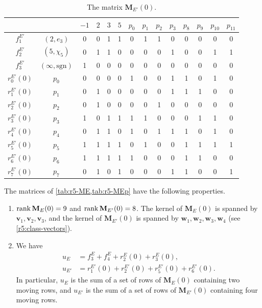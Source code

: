 \begin{table}[htbp]
\centering
\caption{The matrix $\mathbf M_{E'}(0)$.}\label{tab:r5-MEp}
\renewcommand{\arraystretch}{1.15}
\begin{tabular}{cc|cccc|cccccccc}
& & $-1$ & $2$ & $3$ & $5$ & $p_0$ & $p_1$ & $p_2$ & $p_3$ & $p_8$ & $p_9$ & $p_{10}$ & $p_{11}$\\
\hline
$f^{E'}_1$ & $(2,e_3)$ & 0 & 0 & 1 & 1 & 0 & 1 & 1 & 0 & 0 & 0 & 0 & 0 \\
$f^{E'}_2$ & $(5,\chi_5)$ & 0 & 1 & 1 & 0 & 0 & 0 & 0 & 1 & 0 & 0 & 1 & 1 \\
$f^{E'}_3$ & $(\infty,\mathrm{sgn})$ & 1 & 0 & 0 & 0 & 0 & 0 & 0 & 0 & 0 & 0 & 0 & 0 \\
\hline
$r^{E'}_0(0)$ & $p_0$ & 0 & 0 & 0 & 0 & 1 & 0 & 0 & 1 & 1 & 0 & 1 & 0 \\
$r^{E'}_1(0)$ & $p_1$ & 0 & 1 & 0 & 0 & 0 & 0 & 0 & 1 & 1 & 1 & 0 & 0 \\
$r^{E'}_2(0)$ & $p_2$ & 0 & 1 & 0 & 0 & 0 & 0 & 1 & 0 & 0 & 0 & 0 & 0 \\
$r^{E'}_3(0)$ & $p_3$ & 1 & 0 & 1 & 1 & 1 & 1 & 0 & 0 & 0 & 1 & 1 & 0 \\
$r^{E'}_4(0)$ & $p_4$ & 0 & 1 & 1 & 0 & 1 & 0 & 1 & 1 & 1 & 0 & 1 & 0 \\
$r^{E'}_5(0)$ & $p_5$ & 1 & 1 & 1 & 1 & 0 & 1 & 0 & 0 & 1 & 1 & 1 & 1 \\
$r^{E'}_6(0)$ & $p_6$ & 1 & 1 & 1 & 1 & 1 & 0 & 0 & 0 & 1 & 1 & 0 & 0 \\
$r^{E'}_7(0)$ & $p_7$ & 0 & 1 & 0 & 1 & 0 & 0 & 0 & 1 & 1 & 0 & 0 & 1 \\
\end{tabular}
\end{table}

\begin{lemma}\label{lem:r5-certificate}
The matrices of \cref{tab:r5-ME,tab:r5-MEp} have the following properties.
\begin{enumerate}[label=(\alph*)]
\item\label{item:r5-cert-rank} $\operatorname{rank}\mathbf M_E(0)=9$ and $\operatorname{rank}\mathbf M_{E'}(0)=8$. The kernel of $\mathbf M_E(0)$ is spanned by $\mathbf v_1,\mathbf v_2,\mathbf v_3$, and the kernel of $\mathbf M_{E'}(0)$ is spanned by $\mathbf w_1,\mathbf w_2,\mathbf w_3,\mathbf w_4$ (see \eqref{r5:class-vectors}).
\item\label{item:r5-cert-u} We have
\begin{equation}\label{r5:u-sums}
\begin{aligned}
u_E&=f^E_3+f^E_4+r^E_2(0)+r^E_3(0),\\
u_{E'}&=r^{E'}_1(0)+r^{E'}_2(0)+r^{E'}_5(0)+r^{E'}_6(0).
\end{aligned}
\end{equation}
In particular, $u_E$ is the sum of a set of rows of $\mathbf M_E(0)$ containing two moving rows, and $u_{E'}$ is the sum of a set of rows of $\mathbf M_{E'}(0)$ containing four moving rows.
\end{enumerate}
\end{lemma}

